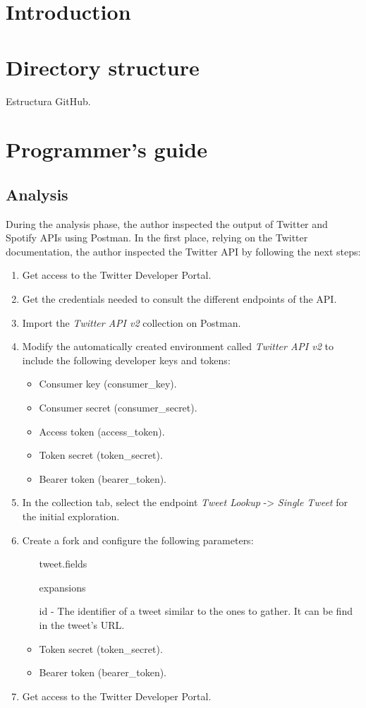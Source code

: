 
\section{Introduction}

\section{Directory structure}
Estructura GitHub.

\section{Programmer's guide}

\subsection{Analysis}

\nonzeroparskip During the analysis phase, the author inspected the output of Twitter and Spotify APIs using Postman. In the first place, relying on the Twitter documentation, the author inspected the Twitter API by following the next steps:
\begin{enumerate}
	\item Get access to the Twitter Developer Portal.
	\item Get the credentials needed to consult the different endpoints of the API.
	\item Import the \textit{Twitter API v2} collection on Postman.
	\item Modify the automatically created environment called \textit{Twitter API v2} to include the following developer keys and tokens:
	\begin{itemize}
		\item Consumer key (consumer\_key).
		\item Consumer secret (consumer\_secret).
		\item Access token (access\_token).
		\item Token secret (token\_secret).
		\item Bearer token (bearer\_token).
	\end{itemize}
	\item In the collection tab, select the endpoint \textit{Tweet Lookup} -> \textit{Single Tweet} for the initial exploration.
	\item Create a fork and configure the following parameters:
	\begin{itemize}
		\item[tweet.fields] 
		\item[expansions]
		\item[id] - The identifier of a tweet similar to the ones to gather. It can be find in the tweet's URL.
		\item Token secret (token\_secret).
		\item Bearer token (bearer\_token).
	\end{itemize}
	\item Get access to the Twitter Developer Portal.
\end{enumerate}

